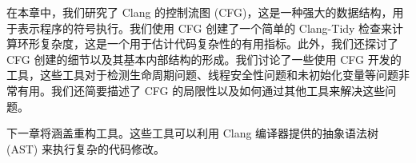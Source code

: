 在本章中，我们研究了 Clang 的控制流图 (CFG)，这是一种强大的数据结构，用于表示程序的符号执行。我们使用 CFG 创建了一个简单的 Clang-Tidy 检查来计算环形复杂度，这是一个用于估计代码复杂性的有用指标。此外，我们还探讨了 CFG 创建的细节以及其基本内部结构的形成。我们讨论了一些使用 CFG 开发的工具，这些工具对于检测生命周期问题、线程安全性问题和未初始化变量等问题非常有用。我们还简要描述了 CFG 的局限性以及如何通过其他工具来解决这些问题。

下一章将涵盖重构工具。这些工具可以利用 Clang 编译器提供的抽象语法树 (AST) 来执行复杂的代码修改。
